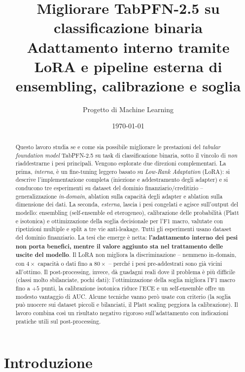 \documentclass[11pt,a4paper]{article}
\title{\textbf{Migliorare TabPFN-2.5 su classificazione binaria}\\
\large Adattamento interno tramite LoRA e pipeline esterna di
ensembling, calibrazione e soglia}
\author{Progetto di Machine Learning}
\date{\today}
\begin{document}
\maketitle

\begin{abstract}
\noindent
Questo lavoro studia se e come sia possibile migliorare le prestazioni del
\emph{tabular foundation model} TabPFN-2.5 su task di classificazione binaria,
sotto il vincolo di \emph{non} riaddestrarne i pesi principali. Vengono
esplorate due direzioni complementari. La prima, \emph{interna}, è un
fine-tuning leggero basato su \emph{Low-Rank Adaptation} (LoRA): si descrive
l'implementazione completa (iniezione e addestramento degli adapter) e si
conducono tre esperimenti su dataset del dominio finanziario/creditizio --
generalizzazione \emph{in-domain}, ablation sulla capacità degli adapter e
ablation sulla dimensione dei dati. La seconda, \emph{esterna},
lascia i pesi congelati e agisce sull'output del modello: ensembling
(self-ensemble ed eterogeneo), calibrazione delle probabilità (Platt e
isotonica) e ottimizzazione della soglia decisionale per l'F1 macro, valutate
con ripetizioni multiple e split a tre vie anti-leakage. Tutti gli esperimenti
usano dataset del dominio finanziario. La tesi che emerge è netta:
\textbf{l'adattamento interno dei pesi non porta benefici, mentre il valore
aggiunto sta nel trattamento delle uscite del modello}. Il LoRA non migliora la
discriminazione -- nemmeno in-domain, con $4\times$ capacità o dati fino a
$80\times$ -- perché i pesi pre-addestrati sono già vicini all'ottimo. Il
post-processing, invece, dà guadagni reali dove il problema è più difficile
(classi molto sbilanciate, pochi dati): l'ottimizzazione della soglia migliora
l'F1 macro fino a $+5$ punti, la calibrazione isotonica riduce l'ECE e un
self-ensemble offre un modesto vantaggio di AUC. Alcune tecniche vanno però usate
con criterio (la soglia può nuocere sui dataset piccoli e bilanciati, il Platt
scaling peggiora la calibrazione). Il lavoro combina così un risultato negativo
rigoroso sull'adattamento con indicazioni pratiche utili sul post-processing.
\end{abstract}

\tableofcontents
\bigskip

\section{Introduzione}
\end{document}
